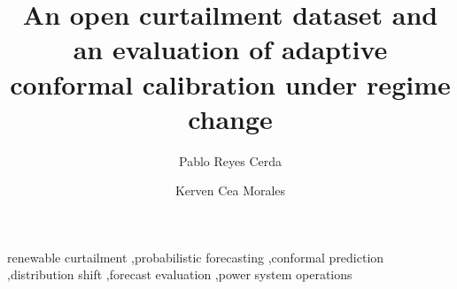 \documentclass[preprint,3p,times]{elsarticle}
\begin{document}
\begin{frontmatter}

\title{An open curtailment dataset and an evaluation of adaptive conformal calibration under regime change}

\author[usach]{Pablo Reyes Cerda}
\author[ubb]{Kerven Cea Morales}


\address[usach]{Mag\'ister en Gesti\'on de la Innovaci\'on y el Emprendimiento Tecnol\'ogico, Universidad de Santiago de Chile, Santiago, Chile}
\address[ubb]{Programa de Doctorado en Matem\'atica Aplicada, Universidad del B\'io-B\'io, Concepci\'on, Chile}



\begin{keyword}
renewable curtailment \sep probabilistic forecasting \sep conformal prediction \sep distribution shift \sep forecast evaluation \sep power system operations
\end{keyword}

\end{frontmatter}







\end{document}
